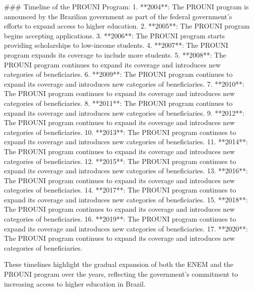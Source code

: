 ### Timeline of the PROUNI Program:
1. **2004**: The PROUNI program is announced by the Brazilian government as part of the federal government's efforts to expand access to higher education.
2. **2005**: The PROUNI program begins accepting applications.
3. **2006**: The PROUNI program starts providing scholarships to low-income students.
4. **2007**: The PROUNI program expands its coverage to include more students.
5. **2008**: The PROUNI program continues to expand its coverage and introduces new categories of beneficiaries.
6. **2009**: The PROUNI program continues to expand its coverage and introduces new categories of beneficiaries.
7. **2010**: The PROUNI program continues to expand its coverage and introduces new categories of beneficiaries.
8. **2011**: The PROUNI program continues to expand its coverage and introduces new categories of beneficiaries.
9. **2012**: The PROUNI program continues to expand its coverage and introduces new categories of beneficiaries.
10. **2013**: The PROUNI program continues to expand its coverage and introduces new categories of beneficiaries.
11. **2014**: The PROUNI program continues to expand its coverage and introduces new categories of beneficiaries.
12. **2015**: The PROUNI program continues to expand its coverage and introduces new categories of beneficiaries.
13. **2016**: The PROUNI program continues to expand its coverage and introduces new categories of beneficiaries.
14. **2017**: The PROUNI program continues to expand its coverage and introduces new categories of beneficiaries.
15. **2018**: The PROUNI program continues to expand its coverage and introduces new categories of beneficiaries.
16. **2019**: The PROUNI program continues to expand its coverage and introduces new categories of beneficiaries.
17. **2020**: The PROUNI program continues to expand its coverage and introduces new categories of beneficiaries.

These timelines highlight the gradual expansion of both the ENEM and the PROUNI program over the years, reflecting the government's commitment to increasing access to higher education in Brazil.